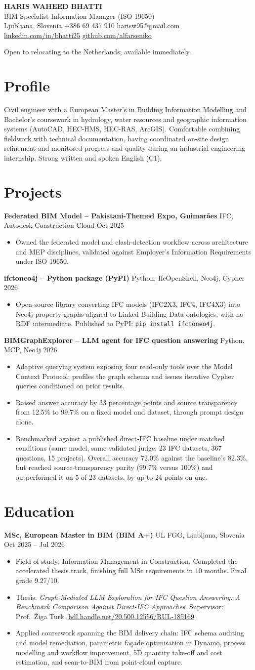 \documentclass[a4paper,10.5pt]{article}
\newcommand{\datefill}{\dotfill}
\newcommand{\entry}[3]{\vspace{2.5pt}\noindent\textbf{#1} \textbar{} #2 \datefill{} #3\par\vspace{0.5pt}}
\newcommand{\ROLELINE}{BIM Specialist \textbar{} Information Manager (ISO 19650)}
\newcommand{\projIfcToNeo}{%
\entry{ifctoneo4j -- Python package (PyPI)}{Python, IfcOpenShell, Neo4j, Cypher}{2026}
\begin{itemize}
  \item Open-source library converting IFC models (IFC2X3, IFC4, IFC4X3) into Neo4j
        property graphs aligned to Linked Building Data ontologies, with no RDF
        intermediate. Published to PyPI: \texttt{pip install ifctoneo4j}.
\end{itemize}}
\newcommand{\projBIMGraph}{%
\entry{BIMGraphExplorer -- LLM agent for IFC question answering}{Python, MCP, Neo4j}{2026}
\begin{itemize}
  \item Adaptive querying system exposing four read-only tools over the Model
        Context Protocol; profiles the graph schema and issues iterative Cypher
        queries conditioned on prior results.
  \item Raised answer accuracy by 33 percentage points and source transparency from
        12.5\% to 99.7\% on a fixed model and dataset, through prompt design alone.
  \item Benchmarked against a published direct-IFC baseline under matched
        conditions (same model, same validated judge; 23 IFC datasets, 367
        questions, 15 projects). Overall accuracy 72.0\% against the baseline's
        82.3\%, but reached source-transparency parity (99.7\% versus 100\%) and
        outperformed it on 5 of 23 datasets, by up to 24 points on one.
\end{itemize}}
\newcommand{\projGuimaraes}{%
\entry{Federated BIM Model -- Pakistani-Themed Expo, Guimar\~aes}{IFC, Autodesk Construction Cloud}{Oct 2025}
\begin{itemize}
  \item Owned the federated model and clash-detection workflow across architecture
        and MEP disciplines, validated against Employer's Information Requirements
        under ISO 19650.
\end{itemize}}
\begin{document}
\begin{center}
  {\LARGE\bfseries HARIS WAHEED BHATTI}\\[2pt]
  {\large \ROLELINE}\\[3pt]
  Ljubljana, Slovenia \textbar{} +386 69 437 910 \textbar{} harisw95@gmail.com\\
  \href{https://linkedin.com/in/bhatti25}{linkedin.com/in/bhatti25} \textbar{}
  \href{https://github.com/alfarseniko}{github.com/alfarseniko}
\end{center}
\vspace{-4pt}
\noindent\small Open to relocating to the Netherlands; available immediately.\normalsize

\section{Profile}

\noindent Civil engineer with a European Master's in Building Information Modelling and
Bachelor's coursework in hydrology, water resources and geographic information
systems (AutoCAD, HEC-HMS, HEC-RAS, ArcGIS). Comfortable combining fieldwork with
technical documentation, having coordinated on-site design refinement and monitored
progress and quality during an industrial engineering internship. Strong written and
spoken English (C1).

\section{Projects}

 \projGuimaraes \projIfcToNeo \projBIMGraph

\section{Education}
\entry{MSc, European Master in BIM (BIM A+)}{UL FGG, Ljubljana, Slovenia}{Oct 2025 -- Jul 2026}
\begin{itemize}
  \item Field of study: Information Management in Construction. Completed the
        accelerated thesis track, finishing full MSc requirements in 10 months.
        Final grade 9.27/10.
  \item Thesis: \textit{Graph-Mediated LLM Exploration for IFC Question Answering:
        A Benchmark Comparison Against Direct-IFC Approaches}. Supervisor:
        Prof.~\v{Z}iga Turk. \href{http://hdl.handle.net/20.500.12556/RUL-185169}{hdl.handle.net/20.500.12556/RUL-185169}
  \item Applied coursework spanning the BIM delivery chain: IFC schema auditing and model remediation, parametric façade optimisation in Dynamo, process modelling and workflow improvement, 5D quantity take-off and cost estimation, and scan-to-BIM from point-cloud capture.
\end{itemize}
\end{document}
